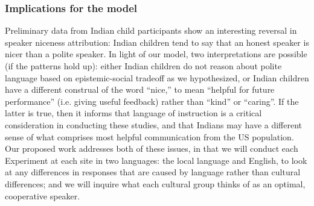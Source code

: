\subsubsection{Implications for the model}

Preliminary data from Indian child participants show an interesting reversal in speaker niceness attribution: Indian children tend to say that an honest speaker is nicer than a polite speaker. In light of our model, two interpretations are possible (if the patterns hold up): either Indian children do not reason about polite language based on epistemic-social tradeoff as we hypothesized, or Indian children have a different construal of the word ``nice,'' to mean ``helpful for future performance'' (i.e. giving useful feedback) rather than ``kind'' or ``caring''. If the latter is true, then it informs that language of instruction is a critical consideration in conducting these studies, and that Indians may have a different sense of what comprises most helpful communication from the US population. Our proposed work addresses both of these issues, in that we will conduct each Experiment at each site in two languages: the local language and English, to look at any differences in responses that are caused by language rather than cultural differences; and we will inquire what each cultural group thinks of as an optimal, cooperative speaker.



